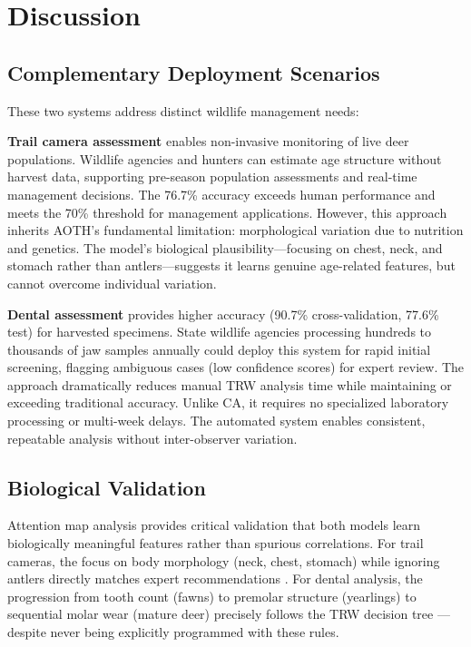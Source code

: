 \documentclass[11pt]{article}
\begin{document}
\section{Discussion}

\subsection{Complementary Deployment Scenarios}

These two systems address distinct wildlife management needs:

\textbf{Trail camera assessment} enables non-invasive monitoring of live deer populations. Wildlife agencies and hunters can estimate age structure without harvest data, supporting pre-season population assessments and real-time management decisions. The 76.7\% accuracy exceeds human performance and meets the 70\% threshold for management applications. However, this approach inherits AOTH's fundamental limitation: morphological variation due to nutrition and genetics. The model's biological plausibility—focusing on chest, neck, and stomach rather than antlers—suggests it learns genuine age-related features, but cannot overcome individual variation.

\textbf{Dental assessment} provides higher accuracy (90.7\% cross-validation, 77.6\% test) for harvested specimens. State wildlife agencies processing hundreds to thousands of jaw samples annually could deploy this system for rapid initial screening, flagging ambiguous cases (low confidence scores) for expert review. The approach dramatically reduces manual TRW analysis time while maintaining or exceeding traditional accuracy. Unlike CA, it requires no specialized laboratory processing or multi-week delays. The automated system enables consistent, repeatable analysis without inter-observer variation.

\subsection{Biological Validation}

Attention map analysis provides critical validation that both models learn biologically meaningful features rather than spurious correlations. For trail cameras, the focus on body morphology (neck, chest, stomach) while ignoring antlers directly matches expert recommendations \cite{demarais1999hunter, richards2003observing}. For dental analysis, the progression from tooth count (fawns) to premolar structure (yearlings) to sequential molar wear (mature deer) precisely follows the TRW decision tree \cite{severinghaus1949tooth, larson1980criteria}—despite never being explicitly programmed with these rules.
\end{document}
